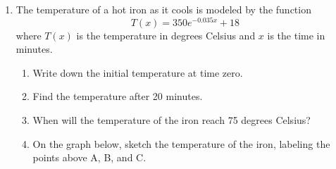 \documentclass[12pt, twoside]{article}
\begin{document}
\begin{enumerate}
\item The temperature of a hot iron as it cools is modeled by the function 
    \[ T(x)=350e^{-0.035x}+18 \] where $T(x)$
    is the temperature in degrees Celsius and $x$ is the time in minutes.
    \begin{enumerate}[itemsep=1cm]
        \item Write down the initial temperature at time zero.
        \item Find the temperature after 20 minutes.
        \item When will the temperature of the iron reach 75 degrees Celsius?
        \item On the graph below, sketch the temperature of the iron, labeling the points above A, B, and C.
    \end{enumerate}
    \begin{center}
    \end{center}

\end{enumerate}
\end{document}
